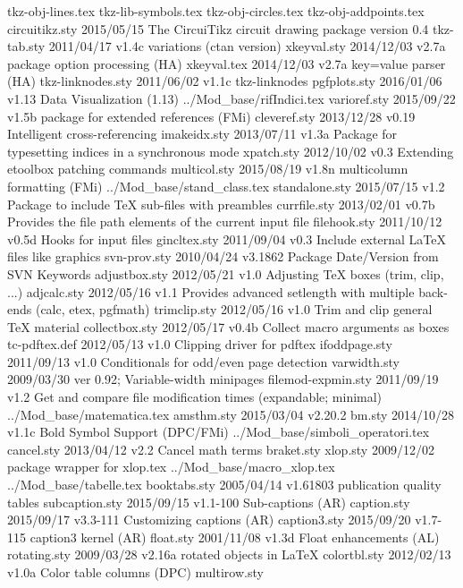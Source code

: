 tkz-obj-lines.tex
tkz-lib-symbols.tex
tkz-obj-circles.tex
tkz-obj-addpoints.tex
circuitikz.sty    2015/05/15 The CircuiTikz circuit drawing package version 0.4
 tkz-tab.sty    2011/04/17 v1.4c variations (ctan version) 
 xkeyval.sty    2014/12/03 v2.7a package option processing (HA)
 xkeyval.tex    2014/12/03 v2.7a key=value parser (HA)
tkz-linknodes.sty    2011/06/02 v1.1c tkz-linknodes
pgfplots.sty    2016/01/06 v1.13 Data Visualization (1.13)
../Mod_base/rifIndici.tex
varioref.sty    2015/09/22 v1.5b package for extended references (FMi)
cleveref.sty    2013/12/28 v0.19 Intelligent cross-referencing
imakeidx.sty    2013/07/11 v1.3a Package for typesetting indices in a synchronous mode
  xpatch.sty    2012/10/02 v0.3 Extending etoolbox patching commands
multicol.sty    2015/08/19 v1.8n multicolumn formatting (FMi)
../Mod_base/stand_class.tex
standalone.sty    2015/07/15 v1.2 Package to include TeX sub-files with preambles
currfile.sty    2013/02/01 v0.7b Provides the file path elements of the current input file
filehook.sty    2011/10/12 v0.5d Hooks for input files
gincltex.sty    2011/09/04 v0.3 Include external LaTeX files like graphics
svn-prov.sty    2010/04/24 v3.1862 Package Date/Version from SVN Keywords
adjustbox.sty    2012/05/21 v1.0 Adjusting TeX boxes (trim, clip, ...)
 adjcalc.sty    2012/05/16 v1.1 Provides advanced setlength with multiple back-ends (calc, etex, pgfmath)
trimclip.sty    2012/05/16 v1.0 Trim and clip general TeX material
collectbox.sty    2012/05/17 v0.4b Collect macro arguments as boxes
tc-pdftex.def    2012/05/13 v1.0 Clipping driver for pdftex
ifoddpage.sty    2011/09/13 v1.0 Conditionals for odd/even page detection
varwidth.sty    2009/03/30 ver 0.92;  Variable-width minipages
filemod-expmin.sty    2011/09/19 v1.2 Get and compare file modification times (expandable; minimal)
../Mod_base/matematica.tex
  amsthm.sty    2015/03/04 v2.20.2
      bm.sty    2014/10/28 v1.1c Bold Symbol Support (DPC/FMi)
../Mod_base/simboli_operatori.tex
  cancel.sty    2013/04/12 v2.2 Cancel math terms
  braket.sty    
    xlop.sty    2009/12/02 package wrapper for xlop.tex
../Mod_base/macro_xlop.tex
../Mod_base/tabelle.tex
booktabs.sty    2005/04/14 v1.61803 publication quality tables
subcaption.sty    2015/09/15 v1.1-100 Sub-captions (AR)
 caption.sty    2015/09/17 v3.3-111 Customizing captions (AR)
caption3.sty    2015/09/20 v1.7-115 caption3 kernel (AR)
   float.sty    2001/11/08 v1.3d Float enhancements (AL)
rotating.sty    2009/03/28 v2.16a rotated objects in LaTeX
colortbl.sty    2012/02/13 v1.0a Color table columns (DPC)
multirow.sty    
